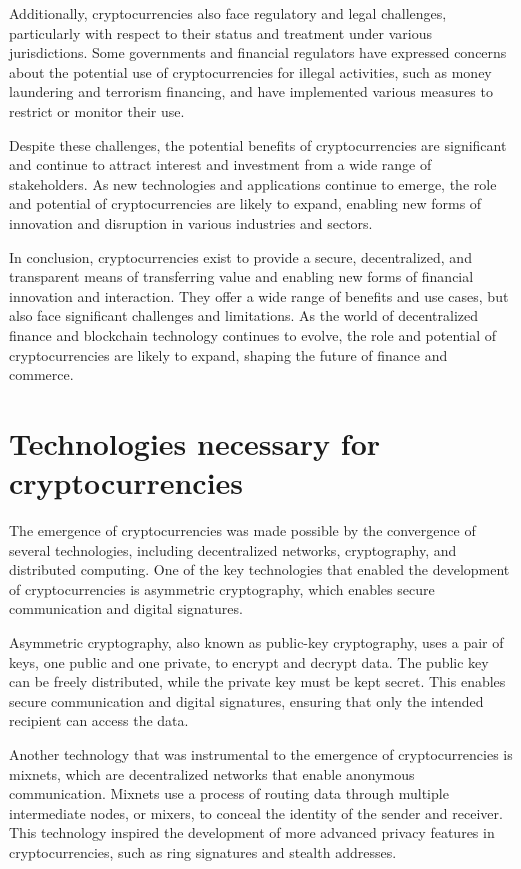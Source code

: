 \documentclass[a4paper, 10pt]{article}
\begin{document}
Additionally, cryptocurrencies also face regulatory and legal challenges, particularly with respect to their status and treatment under various jurisdictions. Some governments and financial regulators have expressed concerns about the potential use of cryptocurrencies for illegal activities, such as money laundering and terrorism financing, and have implemented various measures to restrict or monitor their use.

Despite these challenges, the potential benefits of cryptocurrencies are significant and continue to attract interest and investment from a wide range of stakeholders. As new technologies and applications continue to emerge, the role and potential of cryptocurrencies are likely to expand, enabling new forms of innovation and disruption in various industries and sectors.

In conclusion, cryptocurrencies exist to provide a secure, decentralized, and transparent means of transferring value and enabling new forms of financial innovation and interaction. They offer a wide range of benefits and use cases, but also face significant challenges and limitations. As the world of decentralized finance and blockchain technology continues to evolve, the role and potential of cryptocurrencies are likely to expand, shaping the future of finance and commerce. 

\section{Technologies necessary for cryptocurrencies}\label{Technologies necessary for cryptocurrencies}

The emergence of cryptocurrencies was made possible by the convergence of several technologies, including decentralized networks, cryptography, and distributed computing. One of the key technologies that enabled the development of cryptocurrencies is asymmetric cryptography, which enables secure communication and digital signatures.

Asymmetric cryptography, also known as public-key cryptography, uses a pair of keys, one public and one private, to encrypt and decrypt data. The public key can be freely distributed, while the private key must be kept secret. This enables secure communication and digital signatures, ensuring that only the intended recipient can access the data.

Another technology that was instrumental to the emergence of cryptocurrencies is mixnets, which are decentralized networks that enable anonymous communication. Mixnets use a process of routing data through multiple intermediate nodes, or mixers, to conceal the identity of the sender and receiver. This technology inspired the development of more advanced privacy features in cryptocurrencies, such as ring signatures and stealth addresses.
\end{document}

